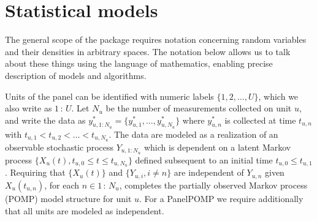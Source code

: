 \section{Statistical models}\label{statistical-models}

The general scope of the  package requires notation concerning random variables and their densities in arbitrary spaces.
The notation below allows us to talk about these things using the language of mathematics, enabling precise description of models and algorithms.

Units of the panel can be identified with numeric labels \(\{1,2,\dots,U\}\), which we also write as \(1\,{:}\,U\).
Let \(N_u\) be the number of measurements collected on unit \(u\), and write the data as \(y^*_{u,1:N_{u}} = \{y^*_{u,1},\dots,y^*_{u,N_u}\}\) where \(y^*_{u,n}\) is collected at time \(t_{u,n}\) with \(t_{u,1}<t_{u,2}<\dots<t_{u,N_u}\).
The data are modeled as a realization of an observable stochastic process \(Y_{u,1:N_u}\) which is dependent on a latent Markov process \(\{X_u(t),t_{u,0}\le t\le t_{u,N_u}\}\) defined subsequent to an initial time \(t_{u,0}\le t_{u,1}\).
Requiring that \(\{X_u(t)\}\) and \(\{Y_{u,i},i\neq n\}\) are independent of \(Y_{u,n}\) given \(X_u(t_{u,n})\), for each \(n\in 1\,{:}\, N_{u}\), completes the partially observed Markov process (POMP) model structure for unit \(u\).
For a PanelPOMP we require additionally that all units are modeled as independent.

